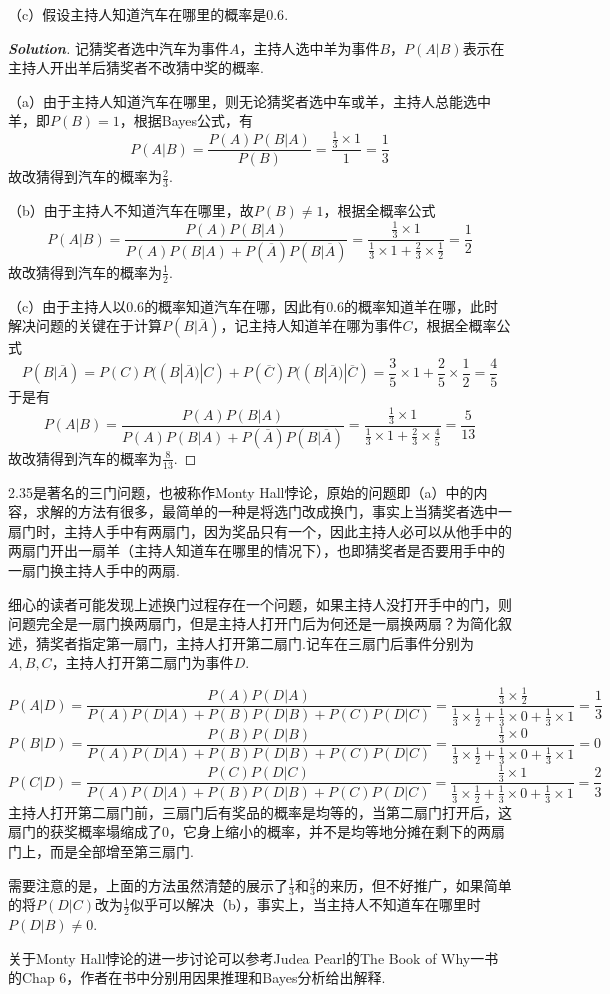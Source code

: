 \documentclass[10pt, a4paper, oneside]{ctexart}
\newenvironment{solution}{\begin{proof}[\bf Solution]}{\end{proof}}
\begin{document}
（c）假设主持人知道汽车在哪里的概率是$0.6$.
\begin{solution}
记猜奖者选中汽车为事件$A$，主持人选中羊为事件$B$，$P(A|B)$表示在主持人开出羊后猜奖者不改猜中奖的概率.

（a）由于主持人知道汽车在哪里，则无论猜奖者选中车或羊，主持人总能选中羊，即$P(B)=1$，根据Bayes公式，有
\[P(A|B) = \frac{{P(A)P(B|A)}}{{P(B)}} = \frac{{\frac{1}{3} \times 1}}{1} = \frac{1}{3}\]
故改猜得到汽车的概率为$\frac{2}{3}$.

（b）由于主持人不知道汽车在哪里，故$P(B)\ne 1$，根据全概率公式
\[P(A|B) = \frac{{P(A)P(B|A)}}{{P(A)P(B|A) + P(\overline A )P(B|\overline A )}} = \frac{{\frac{1}{3} \times 1}}{{\frac{1}{3} \times 1 + \frac{2}{3} \times \frac{1}{2}}} = \frac{1}{2}\]
故改猜得到汽车的概率为$\frac{1}{2}$.

（c）由于主持人以$0.6$的概率知道汽车在哪，因此有$0.6$的概率知道羊在哪，此时解决问题的关键在于计算$P(B|\overline{A})$，记主持人知道羊在哪为事件$C$，根据全概率公式
\[P(B|\overline A ) = P(C)P((B|\overline A )|C) + P(\overline C )P((B|\overline A )|\overline C ) = \frac{3}{5} \times 1 + \frac{2}{5} \times \frac{1}{2} = \frac{4}{5}\]
于是有
\[P(A|B) = \frac{{P(A)P(B|A)}}{{P(A)P(B|A) + P(\overline A )P(B|\overline A )}} = \frac{{\frac{1}{3} \times 1}}{{\frac{1}{3} \times 1 + \frac{2}{3} \times \frac{4}{5}}} = \frac{5}{{13}}\]
故改猜得到汽车的概率为$\frac{8}{13}$.
\end{solution}
\begin{remark}
2.35是著名的三门问题，也被称作Monty Hall悖论，原始的问题即（a）中的内容，求解的方法有很多，最简单的一种是将选门改成换门，事实上当猜奖者选中一扇门时，主持人手中有两扇门，因为奖品只有一个，因此主持人必可以从他手中的两扇门开出一扇羊（主持人知道车在哪里的情况下），也即猜奖者是否要用手中的一扇门换主持人手中的两扇.

细心的读者可能发现上述换门过程存在一个问题，如果主持人没打开手中的门，则问题完全是一扇门换两扇门，但是主持人打开门后为何还是一扇换两扇？为简化叙述，猜奖者指定第一扇门，主持人打开第二扇门.记车在三扇门后事件分别为$A,B,C$，主持人打开第二扇门为事件$D$.
    
\[P(A|D)=\frac{P(A)P(D|A)}{P(A)P(D|A)+P(B)P(D|B)+P(C)P(D|C)}=\frac{\frac{1}{3}\times \frac{1}{2}}{\frac{1}{3}\times \frac{1}{2}+\frac{1}{3}\times 0+\frac{1}{3}\times 1 }=\frac{1}{3}\]
    \[P(B|D)=\frac{P(B)P(D|B)}{P(A)P(D|A)+P(B)P(D|B)+P(C)P(D|C)}=\frac{\frac{1}{3}\times 0}{\frac{1}{3}\times \frac{1}{2}+\frac{1}{3}\times 0+\frac{1}{3}\times 1 }=0\]
    \[P(C|D)=\frac{P(C)P(D|C)}{P(A)P(D|A)+P(B)P(D|B)+P(C)P(D|C)}=\frac{\frac{1}{3}\times 1}{\frac{1}{3}\times \frac{1}{2}+\frac{1}{3}\times 0+\frac{1}{3}\times 1 }=\frac{2}{3}\]
主持人打开第二扇门前，三扇门后有奖品的概率是均等的，当第二扇门打开后，这扇门的获奖概率塌缩成了$0$，它身上缩小的概率，并不是均等地分摊在剩下的两扇门上，而是全部增至第三扇门.

需要注意的是，上面的方法虽然清楚的展示了$\frac{1}{3}$和$\frac{2}{3}$的来历，但不好推广，如果简单的将$P(D|C)$改为$\frac{1}{2}$似乎可以解决（b），事实上，当主持人不知道车在哪里时$P(D|B)\ne 0$.

关于Monty Hall悖论的进一步讨论可以参考Judea Pearl的The Book of Why一书的Chap 6，作者在书中分别用因果推理和Bayes分析给出解释.
\end{remark}
\end{document}
